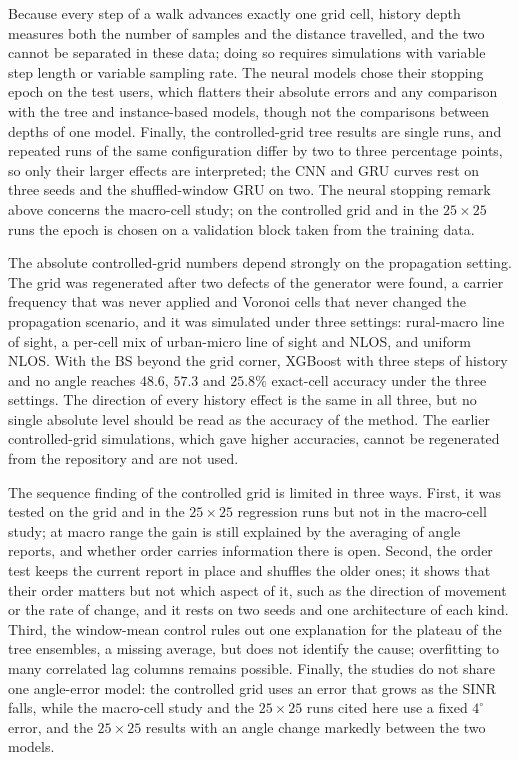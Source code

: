 Because every step of a walk advances exactly one grid cell, history depth measures both the number of samples and the distance travelled, and the two cannot be separated in these data; doing so requires simulations with variable step length or variable sampling rate. The neural models chose their stopping epoch on the test users, which flatters their absolute errors and any comparison with the tree and instance-based models, though not the comparisons between depths of one model. Finally, the controlled-grid tree results are single runs, and repeated runs of the same configuration differ by two to three percentage points, so only their larger effects are interpreted; the CNN and GRU curves rest on three seeds and the shuffled-window GRU on two. The neural stopping remark above concerns the macro-cell study; on the controlled grid and in the $25\times25$ runs the epoch is chosen on a validation block taken from the training data.

The absolute controlled-grid numbers depend strongly on the propagation setting. The grid was regenerated after two defects of the generator were found, a carrier frequency that was never applied and Voronoi cells that never changed the propagation scenario, and it was simulated under three settings: rural-macro line of sight, a per-cell mix of urban-micro line of sight and NLOS, and uniform NLOS. With the BS beyond the grid corner, XGBoost with three steps of history and no angle reaches $48.6$, $57.3$ and $25.8\%$ exact-cell accuracy under the three settings. The direction of every history effect is the same in all three, but no single absolute level should be read as the accuracy of the method. The earlier controlled-grid simulations, which gave higher accuracies, cannot be regenerated from the repository and are not used.

The sequence finding of the controlled grid is limited in three ways. First, it was tested on the grid and in the $25\times25$ regression runs but not in the macro-cell study; at macro range the gain is still explained by the averaging of angle reports, and whether order carries information there is open. Second, the order test keeps the current report in place and shuffles the older ones; it shows that their order matters but not which aspect of it, such as the direction of movement or the rate of change, and it rests on two seeds and one architecture of each kind. Third, the window-mean control rules out one explanation for the plateau of the tree ensembles, a missing average, but does not identify the cause; overfitting to many correlated lag columns remains possible. Finally, the studies do not share one angle-error model: the controlled grid uses an error that grows as the SINR falls, while the macro-cell study and the $25\times25$ runs cited here use a fixed $4^\circ$ error, and the $25\times25$ results with an angle change markedly between the two models.

